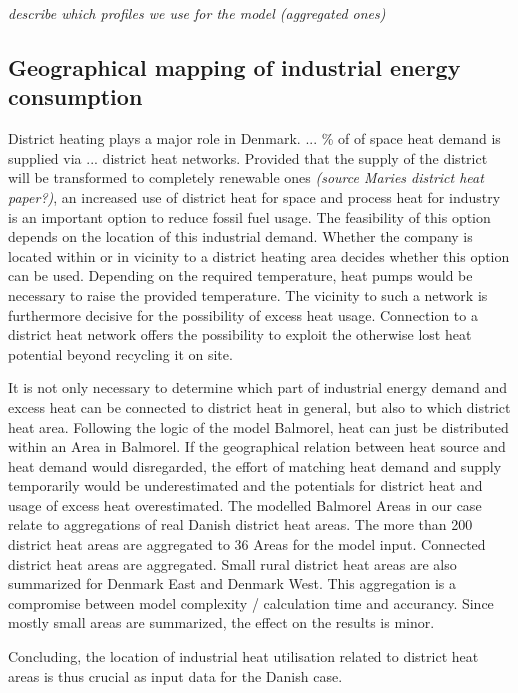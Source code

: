 \documentclass[review]{elsarticle}
\begin{document}
\textit{describe which profiles we use for the model (aggregated ones)}


\subsection{Geographical mapping of industrial energy consumption}
District heating plays a major role in Denmark. ... \% of of space heat demand is supplied via ... district heat networks. Provided that the supply of the district will be transformed to completely renewable ones \textit{(source Maries district heat paper?)}, an increased use of district heat for space and process heat for industry is an important option to reduce fossil fuel usage. The feasibility of this option depends on the location of this industrial demand. Whether the company is located within or in vicinity to a district heating area decides whether this option can be used. Depending on the required temperature, heat pumps would be necessary to raise the provided temperature. The vicinity to such a network is furthermore decisive for the possibility of excess heat usage. Connection to a district heat network offers the possibility to exploit the otherwise lost heat potential beyond recycling it on site.

It is not only necessary to determine which part of industrial energy demand and excess heat can be connected to district heat in general, but also to which district heat area. Following the logic of the model Balmorel, heat can just be distributed within an Area in Balmorel. If the geographical relation between heat source and heat demand would disregarded, the effort of matching heat demand and supply temporarily would be underestimated and the potentials for district heat and usage of excess heat overestimated. The modelled Balmorel Areas in our case relate to aggregations of real Danish district heat areas. The more than 200 district heat areas are aggregated to 36 Areas for the model input. Connected district heat areas are aggregated. Small rural district heat areas are also summarized for Denmark East and Denmark West. This aggregation is a compromise between model complexity / calculation time and accurancy. Since mostly small areas are summarized, the effect on the results is minor.

Concluding, the location of industrial heat utilisation related to district heat areas is thus crucial as input data for the Danish case.
\end{document}
